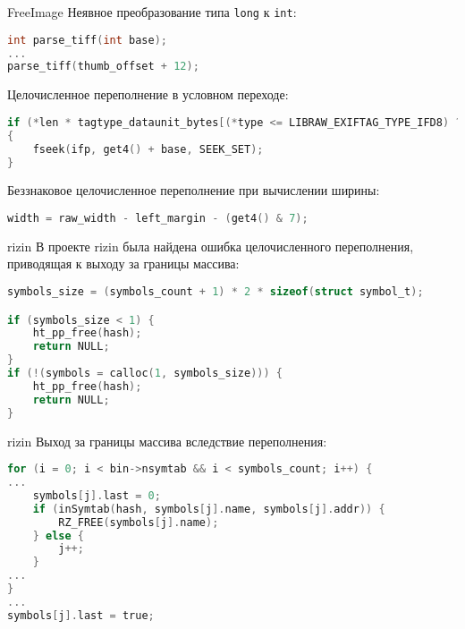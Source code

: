 \documentclass[10pt]{beamer}
\begin{document}
\begin{frame}[fragile]{FreeImage}
Неявное преобразование типа \texttt{long} к \texttt{int}:
\begin{lstlisting}[language=C, basicstyle=\small\ttfamily,
                   xleftmargin=2em,
                   captionpos=b,
                   label=lst:freeimage-tiff-implicit]
int parse_tiff(int base);
...
parse_tiff(thumb_offset + 12);
\end{lstlisting}

Целочисленное переполнение в условном переходе:
\begin{lstlisting}[language=C, basicstyle=\small\ttfamily,
                   xleftmargin=2em,
                   captionpos=b,
                   label=lst:freeimage-condition-overflow]
if (*len * tagtype_dataunit_bytes[(*type <= LIBRAW_EXIFTAG_TYPE_IFD8) ? *type : 0] > 4)
{
    fseek(ifp, get4() + base, SEEK_SET);
}
\end{lstlisting}

Беззнаковое целочисленное переполнение при вычислении ширины:
\begin{lstlisting}[language=C, basicstyle=\small\ttfamily,
                   xleftmargin=2em,
                   captionpos=b,
                   label=lst:freeimage-width-overflow]
width = raw_width - left_margin - (get4() & 7);
\end{lstlisting}
\end{frame}

\begin{frame}[fragile]{rizin}
В проекте rizin была найдена ошибка целочисленного переполнения, приводящая к
выходу за границы массива:
\begin{lstlisting}[language=C, basicstyle=\small\ttfamily,
                   xleftmargin=2em,
                   captionpos=b,
                   label=lst:rizin-overflow]
symbols_size = (symbols_count + 1) * 2 * sizeof(struct symbol_t);

if (symbols_size < 1) {
    ht_pp_free(hash);
    return NULL;
}
if (!(symbols = calloc(1, symbols_size))) {
    ht_pp_free(hash);
    return NULL;
}
\end{lstlisting}
\end{frame}

\begin{frame}[fragile]{rizin}
Выход за границы массива вследствие переполнения:
\begin{lstlisting}[language=C, basicstyle=\small\ttfamily,
                   xleftmargin=2em,
                   captionpos=b,
                   label=lst:rizin-oob]
for (i = 0; i < bin->nsymtab && i < symbols_count; i++) {
...
    symbols[j].last = 0;
    if (inSymtab(hash, symbols[j].name, symbols[j].addr)) {
        RZ_FREE(symbols[j].name);
    } else {
        j++;
    }
...
}
...
symbols[j].last = true;
\end{lstlisting}
\end{frame}
\end{document}
